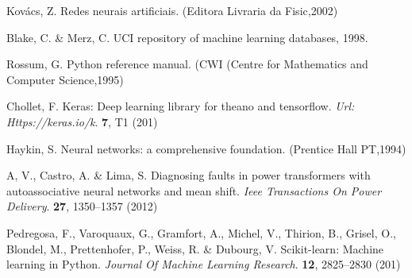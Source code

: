 

\begin{thebibliography}{99}
Kovács, Z. Redes neurais artificiais.  (Editora Livraria da Fisic,2002)

Blake, C. \& Merz, C. UCI repository of machine learning databases, 1998.

Rossum, G. Python reference manual.  (CWI (Centre for Mathematics and Computer Science,1995)

Chollet, F. Keras: Deep learning library for theano and tensorflow.  {\em Url: Https://keras.io/k}. \textbf{7}, T1 (201)

Haykin, S. Neural networks: a comprehensive foundation.  (Prentice Hall PT,1994)

A, V., Castro, A. \& Lima, S. Diagnosing faults in power transformers with autoassociative neural networks and mean shift.  {\em Ieee Transactions On Power Delivery}. \textbf{27}, 1350--1357 (2012)

Pedregosa, F., Varoquaux, G., Gramfort, A., Michel, V., Thirion, B., Grisel, O., Blondel, M., Prettenhofer, P., Weiss, R. \& Dubourg, V. Scikit-learn: Machine learning in Python.  {\em Journal Of Machine Learning Research}. \textbf{12}, 2825--2830 (201)

\end{thebibliography}
